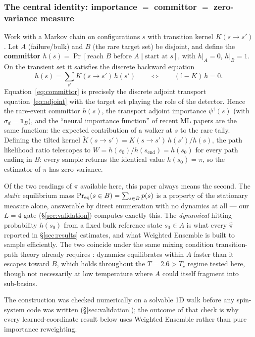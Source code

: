 \documentclass[a4paper,fleqn]{cas-sc}
\newcommand{\dg}{^{\dagger}}
\begin{document}
	\subsubsection{The central identity: importance $=$ committor $=$ zero-variance measure}\label{sec:identity}
	Work with a Markov chain on configurations $s$ with transition kernel $K(s\to s')$. Let $A$
	(failure/bulk) and $B$ (the rare target set) be disjoint, and define the \textbf{committor}
	$h(s)=\Pr[\text{reach }B\text{ before }A\mid\text{start at }s]$, with $h|_A=0$, $h|_B=1$.
	On the transient set it satisfies the discrete backward equation
	\begin{equation}
		h(s)=\sum_{s'}K(s\to s')\,h(s')\qquad\Longleftrightarrow\qquad (\mathbb I-K)\,h=0 .
		\label{eq:committor}
	\end{equation}
	Equation~\eqref{eq:committor} is precisely the discrete adjoint transport
	equation~\eqref{eq:adjoint} with the target set playing the role of the detector. Hence the
	rare-event committor $h(s)$, the transport adjoint importance $\psi\dg(s)$ (with
	$\sigma_d=\mathbf 1_B$), and the ``neural importance function'' of recent ML papers are the
	same function: the expected contribution of a walker at $s$ to the rare tally. Defining the
	tilted kernel $\widetilde K(s\to s')=K(s\to s')\,h(s')/h(s)$, the path likelihood ratio
	telescopes to $W=h(s_0)/h(s_{\text{end}})=h(s_0)$ for every path ending in $B$: every sample
	returns the identical value $h(s_0)=\pi$, so the estimator of $\pi$ has zero variance.
	
	Of the two readings of $\pi$ available here, this paper always means the second. The
	\emph{static} equilibrium mass $\Pr_{\rm eq}(s\in B)=\sum_{s\in B}p(s)$ is a property of the
	stationary measure alone, answerable by direct enumeration with no dynamics at all --- our
	$L=4$ gate (\S\ref{sec:validation}) computes exactly this. The \emph{dynamical} hitting
	probability $h(s_0)$ from a fixed bulk reference state $s_0\in A$ is what every $\hat\pi$
	reported in \S\ref{sec:results} estimates, and what Weighted Ensemble is built to sample
	efficiently. The two coincide under the same mixing condition transition-path theory
	already requires \cite{e2006}: dynamics equilibrates within $A$ faster than it escapes
	toward $B$, which holds throughout the $T=2.6>T_c$ regime tested here, though not
	necessarily at low temperature where $A$ could itself fragment into sub-basins.
	
	The construction was checked numerically on a solvable 1D walk before any spin-system code
	was written (\S\ref{sec:validation}); the outcome of that check is why every
	learned-coordinate result below uses Weighted Ensemble rather than pure importance
	reweighting.
	
\end{document}
